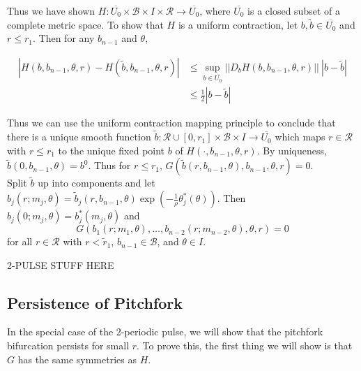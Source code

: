 \documentclass[thesis.tex]{subfiles}
\begin{document}
Thus we have shown $H: \overline{U_0} \times \mathcal{B} \times I \times \mathcal{R} \rightarrow \overline{U_0}$, where $\overline{U_0}$ is a closed subset of a complete metric space. To show that $H$ is a uniform contraction, let $b, \tilde{b} \in \overline{U_0}$ and $r \leq r_1$. Then for any $b_{n-1}$ and $\theta$,

\begin{align*}
|H(b, b_{n-1}, \theta, r) - H(\tilde{b}, b_{n-1}, \theta, r)| 
&\leq \sup_{b\in \overline{U_0}}||D_b H(b, b_{n-1}, \theta, r)||\:|b - \tilde{b}| \\
&\leq \frac{1}{2} |b - \tilde{b}|
\end{align*} 

Thus we can use the uniform contraction mapping principle to conclude that there is a unique smooth function $\tilde{b}: \mathcal{R} \cup [0, r_1] \times \mathcal{B} \times I \rightarrow \overline{U_0}$ which maps $r \in \mathcal{R}$ with $r \leq r_1$ to the unique fixed point $b$ of $H(\cdot, b_{n-1}, \theta, r)$. By uniqueness, $\tilde{b}(0, b_{n-1}, \theta) = b^0$. Thus for $r \leq r_1$, $G(\tilde{b}(r, b_{n-1}, \theta), b_{n-1}, \theta, r) = 0$. \\

Split $\tilde{b}$ up into components and let $b_j(r; m_j, \theta) = \tilde{b}_j(r, b_{n-1}, \theta) \exp( -\frac{1}{\rho} \theta_j^*(\theta) )$. Then $b_j(0; m_j, \theta) = b_j^*(m_j, \theta)$ and 
\[
G(b_1(r; m_1, \theta), \dots, b_{n-2}(r; m_{n-2}, \theta), \theta, r ) = 0
\]
for all $r \in \mathcal{R}$ with $r < \tilde{r}_1$, $b_{n-1} \in \mathcal{B}$, and $\theta \in I$.


2-PULSE STUFF HERE



\subsection{Persistence of Pitchfork}
In the special case of the 2-periodic pulse, we will show that the pitchfork bifurcation persists for small $r$. To prove this, the first thing we will show is that $G$ has the same symmetries as $H$.

\end{document}
